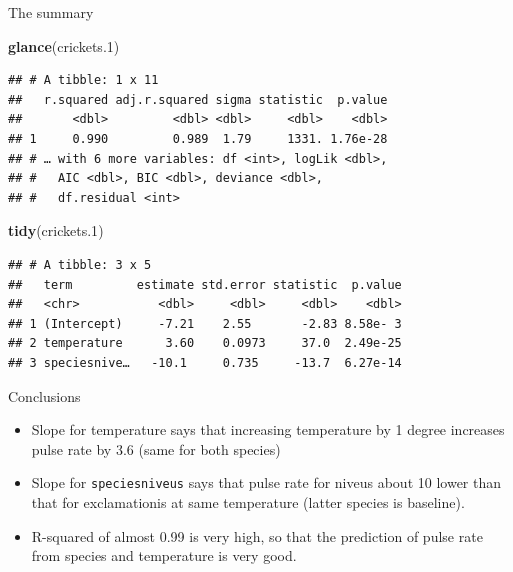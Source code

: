 \documentclass[ignorenonframetext,]{beamer}
\newenvironment{Shaded}{\begin{snugshade}}{\end{snugshade}}
\newcommand{\FloatTok}[1]{\textcolor[rgb]{0.00,0.00,0.81}{#1}}
\newcommand{\KeywordTok}[1]{\textcolor[rgb]{0.13,0.29,0.53}{\textbf{#1}}}
\newcommand{\NormalTok}[1]{#1}
\providecommand{\tightlist}{%
  \setlength{\itemsep}{0pt}\setlength{\parskip}{0pt}}
\begin{document}
\begin{frame}[fragile]{The summary}
\protect\hypertarget{the-summary}{}

\begin{Shaded}
\begin{Highlighting}[]
\KeywordTok{glance}\NormalTok{(crickets}\FloatTok{.1}\NormalTok{)}
\end{Highlighting}
\end{Shaded}

\begin{verbatim}
## # A tibble: 1 x 11
##   r.squared adj.r.squared sigma statistic  p.value
##       <dbl>         <dbl> <dbl>     <dbl>    <dbl>
## 1     0.990         0.989  1.79     1331. 1.76e-28
## # … with 6 more variables: df <int>, logLik <dbl>,
## #   AIC <dbl>, BIC <dbl>, deviance <dbl>,
## #   df.residual <int>
\end{verbatim}

\begin{Shaded}
\begin{Highlighting}[]
\KeywordTok{tidy}\NormalTok{(crickets}\FloatTok{.1}\NormalTok{)}
\end{Highlighting}
\end{Shaded}

\begin{verbatim}
## # A tibble: 3 x 5
##   term         estimate std.error statistic  p.value
##   <chr>           <dbl>     <dbl>     <dbl>    <dbl>
## 1 (Intercept)     -7.21    2.55       -2.83 8.58e- 3
## 2 temperature      3.60    0.0973     37.0  2.49e-25
## 3 speciesnive…   -10.1     0.735     -13.7  6.27e-14
\end{verbatim}

\end{frame}

\begin{frame}[fragile]{Conclusions}
\protect\hypertarget{conclusions}{}

\begin{itemize}
\tightlist
\item
  Slope for temperature says that increasing temperature by 1 degree
  increases pulse rate by 3.6 (same for both species)
\item
  Slope for \texttt{speciesniveus} says that pulse rate for niveus about
  10 lower than that for exclamationis at same temperature (latter
  species is baseline).
\item
  R-squared of almost 0.99 is very high, so that the prediction of pulse
  rate from species and temperature is very good.
\end{itemize}

\end{frame}
\end{document}
